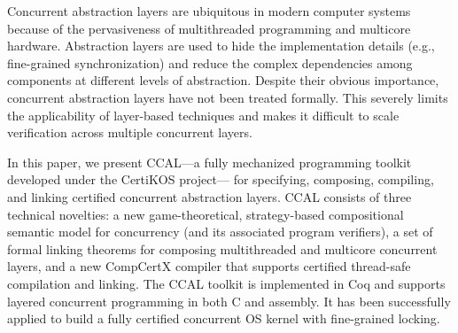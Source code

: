 Concurrent abstraction layers are ubiquitous in modern computer
systems because of the pervasiveness of multithreaded programming and
multicore hardware.  Abstraction layers are used to hide the
implementation details (e.g., fine-grained synchronization) and reduce
the complex dependencies among components at different levels of
abstraction. Despite their obvious importance, concurrent abstraction
layers have not been treated formally.  This severely limits the
applicability of layer-based techniques and makes it difficult to
scale verification across multiple concurrent layers.

In this paper, we present CCAL---a fully mechanized programming
toolkit developed under the CertiKOS project--- for specifying, composing, compiling, and linking certified
concurrent abstraction layers. CCAL consists of three technical
novelties: a new game-theoretical, strategy-based compositional
semantic model for concurrency (and its associated program verifiers),
a set of formal linking theorems for composing multithreaded and
multicore concurrent layers, and a new CompCertX compiler that
supports certified thread-safe compilation and linking.  The CCAL
toolkit is implemented in Coq and supports
layered concurrent programming in both C and assembly. 
{It has
been successfully applied to build a fully certified
concurrent OS kernel with fine-grained locking.}
